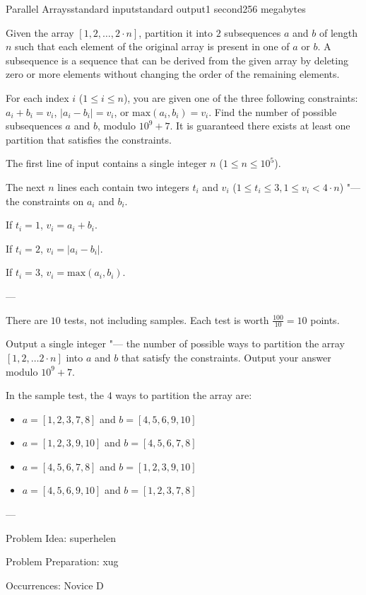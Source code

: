 \begin{problem}{Parallel Arrays}{standard input}{standard output}{1 second}{256 megabytes}

Given the array $[ 1,2, \ldots ,2 \cdot n ]$, partition it into $2$ subsequences $a$ and $b$ of length $n$ such that each element of the original array is present in one of $a$ or $b$. A subsequence is a sequence that can be derived from the given array by deleting zero or more elements without changing the order of the remaining elements.

For each index $i$ ($ 1 \le i \le n$), you are given one of the three following constraints: $a_i+b_i = v_i$, $|a_i-b_i| = v_i$, or $\text{max}(a_i, b_i) = v_i$. Find the number of possible subsequences $a$ and $b$, modulo $10^9+7$. It is guaranteed there exists at least one partition that satisfies the constraints.

\InputFile
The first line of input contains a single integer $n$ ($1 \le n \le 10^5$).

The next $n$ lines each contain two integers $t_i$ and $v_i$ ($1 \le t_i \le 3, 1 \le v_i < 4 \cdot n$) "--- the constraints on $a_i$ and $b_i$.

If $t_i=1$, $v_i=a_i+b_i$.

If $t_i=2$, $v_i=|a_i-b_i|$.

If $t_i=3$, $v_i=\text{max}(a_i, b_i)$.

---

There are $10$ tests, not including samples. Each test is worth $\frac{100}{10}=10$ points.

\OutputFile
Output a single integer "--- the number of possible ways to partition the array $[ 1,2, \ldots 2 \cdot n ]$ into $a$ and $b$ that satisfy the constraints. Output your answer modulo $10^9+7$.

\Example

\begin{example}
%
\end{example}

\Note
In the sample test, the $4$ ways to partition the array are:
\begin{itemize}
\item $a=[1,2,3,7,8]$ and $b=[4,5,6,9,10]$
\item $a=[1,2,3,9,10]$ and $b=[4,5,6,7,8]$
\item $a=[4,5,6,7,8]$ and $b=[1,2,3,9,10]$
\item $a=[4,5,6,9,10]$ and $b=[1,2,3,7,8]$
\end{itemize}

---

Problem Idea: superhelen

Problem Preparation: xug

Occurrences: Novice D

\end{problem}

